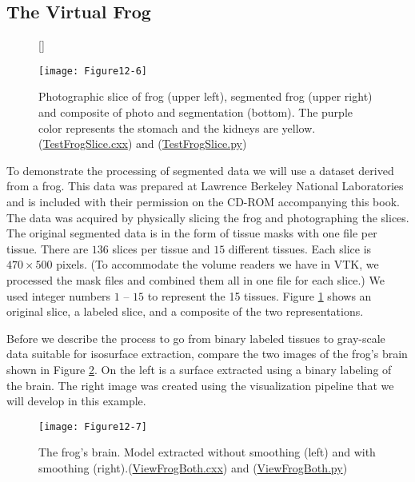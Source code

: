 \subsection{The Virtual Frog}

\begin{figure}[!htb]
	[\FBwidth]
	{\caption{Photographic slice of frog (upper left), segmented frog (upper right) and composite of photo and segmentation (bottom). The purple color represents the stomach and the kidneys are yellow.(\href{https://lorensen.github.io/VTKExamples/site/Cxx/Visualization/TestFrogSlice/}{TestFrogSlice.cxx}) and (\href{https://lorensen.github.io/VTKExamples/site/Python/Visualization/TestFrogSlice/}{TestFrogSlice.py})}\label{fig:Figure12-6}}
	{\texttt{[image: Figure12-6]}}
\end{figure}

To demonstrate the processing of segmented data we will use a dataset derived from a frog. This data was prepared at Lawrence Berkeley National Laboratories and is included with their permission on the CD-ROM accompanying this book. The data was acquired by physically slicing the frog and photographing the slices. The original segmented data is in the form of tissue masks with one file per tissue. There are $136$ slices per tissue and $15$ different tissues. Each slice is $470 \times 500$ pixels. (To accommodate the volume readers we have in VTK, we processed the mask files and combined them all in one file for each slice.) We used integer numbers $1$ -- $15$ to represent the 15 tissues. Figure \ref{fig:Figure12-6} shows an original slice, a labeled slice, and a composite of the two representations.

Before we describe the process to go from binary labeled tissues to gray-scale data suitable for isosurface extraction, compare the two images of the frog's brain shown in Figure \ref{fig:Figure12-7}. On the left is a surface extracted using a binary labeling of the brain. The right image was created using the visualization pipeline that we will develop in this example.

\begin{figure}[!htb]
	\centering
	\texttt{[image: Figure12-7]}
	\caption{The frog's brain. Model extracted without smoothing (left) and with smoothing (right).(\href{https://lorensen.github.io/VTKExamples/site/Cxx/Visualization/ViewFrogBoth/}{ViewFrogBoth.cxx}) and (\href{https://lorensen.github.io/VTKExamples/site/Python/Visualization/ViewFrogBoth/}{ViewFrogBoth.py})}
	\label{fig:Figure12-7}
\end{figure}

